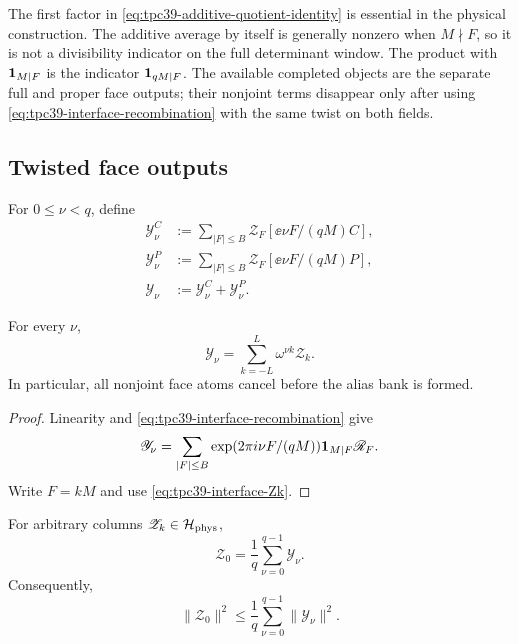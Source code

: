 The first factor in \eqref{eq:tpc39-additive-quotient-identity} is
essential in the physical construction.  The additive average by itself
is generally nonzero when \(M\nmid F\), so it is not a divisibility
indicator on the full determinant window.  The product with
\(\mathbf 1_{M\mid F}\) is the indicator \(\mathbf 1_{qM\mid F}\).  The available
completed objects are the separate full and proper face outputs; their
nonjoint terms disappear only after using
\eqref{eq:tpc39-interface-recombination} with the same twist on both
fields.

\subsection{Twisted face outputs}

For \(0\le\nu<q\), define
\begin{align}
 \mathscr Y_\nu^C
 &:=%
 \sum_{|F|\le B}
 \mathscr Z_F\!\left[
  \ee{\nu F/(qM)}C
 \right],
 \label{eq:tpc39-Ynu-C}\\
 \mathscr Y_\nu^P
 &:=%
 \sum_{|F|\le B}
 \mathscr Z_F\!\left[
  \ee{\nu F/(qM)}P
 \right],
 \label{eq:tpc39-Ynu-P}\\
 \mathscr Y_\nu
 &:=\mathscr Y_\nu^C+\mathscr Y_\nu^P.
 \label{eq:tpc39-Ynu}
\end{align}

\begin{proposition}
\label{prop:tpc39-recombined-twist}
For every \(\nu\),
\begin{equation}
 \boxed{
 \mathscr Y_\nu
 =\sum_{k=-L}^{L}\omega^{\nu k}\mathscr Z_k.}
 \label{eq:tpc39-recombined-twist}
\end{equation}
In particular, all nonjoint face atoms cancel before the alias bank is
formed.
\end{proposition}

\begin{proof}
Linearity and \eqref{eq:tpc39-interface-recombination} give
\[
 \mathscr Y_\nu
 =\sum_{|F|\le B}
 \exp(2\pi i \nu F/(qM))\mathbf 1_{M\mid F}\mathscr R_F.
\]
Write \(F=kM\) and use \eqref{eq:tpc39-interface-Zk}.
\end{proof}

\begin{theorem}
\label{thm:tpc39-exact-Hilbert-recovery}
For arbitrary columns \(\mathscr Z_k\in\mathcal H_{\rm phys}\),
\begin{equation}
 \boxed{
 \mathscr Z_0
 =\frac1q\sum_{\nu=0}^{q-1}\mathscr Y_\nu.}
 \label{eq:tpc39-exact-Hilbert-recovery}
\end{equation}
Consequently,
\begin{equation}
 \boxed{
 \|\mathscr Z_0\|^2
 \le\frac1q\sum_{\nu=0}^{q-1}\|\mathscr Y_\nu\|^2.}
 \label{eq:tpc39-condition-one-recovery}
\end{equation}
\end{theorem}

